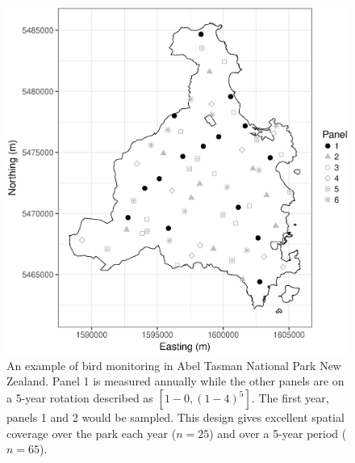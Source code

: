 \documentclass[titlepage]{article}
\begin{document}
\begin{figure}[H]
	\includegraphics[width = \textwidth]{Tasman.eps}
	\caption{An example of bird monitoring in Abel Tasman National Park New Zealand. Panel 1 is measured annually while the other panels are on a 5-year rotation described as $[1-0,(1-4)^5]$. The first year, panels 1 and 2 would be sampled. This design gives excellent spatial coverage over the park each year ($n = 25$) and over a 5-year period ($n=65$).}
	\label{Tasman}
\end{figure}
\end{document}
